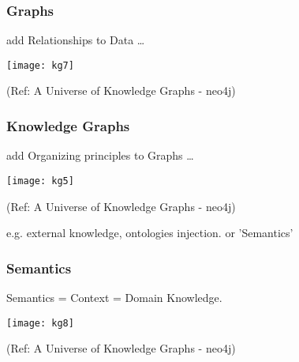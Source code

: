 \begin{frame}[fragile]\frametitle{Graphs}
 
 add Relationships to Data \ldots
 
 
			\begin{center}
			\texttt{[image: kg7]}
			\end{center}	
			
			{\tiny (Ref: A Universe of Knowledge Graphs - neo4j)}
		
		
\end{frame}

\begin{frame}[fragile]\frametitle{Knowledge Graphs}
 
 add Organizing principles to Graphs \ldots
 
 
			\begin{center}
			\texttt{[image: kg5]}
			\end{center}	
			
			{\tiny (Ref: A Universe of Knowledge Graphs - neo4j)}
		
		e.g. external knowledge, ontologies injection. or 'Semantics'
		
\end{frame}


\begin{frame}[fragile]\frametitle{Semantics}
 
Semantics = Context = Domain Knowledge. 
 
			\begin{center}
			\texttt{[image: kg8]}
			\end{center}	
			
			{\tiny (Ref: A Universe of Knowledge Graphs - neo4j)}
		
	
\end{frame}

